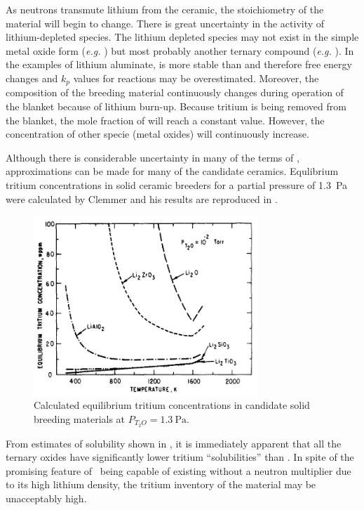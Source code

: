 \documentclass[11pt]{report} %
\newcommand{\lio}{\ce{Li2O}}
\begin{document}
As neutrons transmute lithium from the ceramic, the stoichiometry of the material will begin to change. There is great uncertainty in the activity of lithium-depleted species. The lithium depleted species may not exist in the simple metal oxide form (\textit{e.g.} ) but most probably another ternary compound (\textit{e.g.} ). In the examples of lithium aluminate,  is more stable than  and therefore free energy changes and $k_p$ values for reactions may be overestimated. Moreover, the composition of the breeding material continuously changes during operation of the blanket because of lithium burn-up. Because tritium is being removed from the blanket, the mole fraction of  will reach a constant value. However, the concentration of other specie (metal oxides) will continuously increase.

Although there is considerable uncertainty in many of the terms of , approximations can be made for many of the candidate ceramics. Equlibrium tritium concentrations in solid ceramic breeders for a  partial pressure of \SI{1.3}{\pascal} were calculated by Clemmer and his results are reproduced in .\cite{Clemmer1980}

\begin{figure}[ht]
	\centering
	\includegraphics[width=0.75\textwidth]{images/solubility} 
	\caption{Calculated equilibrium tritium concentrations in candidate solid breeding materials at $P_{T_2O} = \SI{1.3}{\pascal}$.}
	\label{fig:solubility}
\end{figure}

From estimates of solubility shown in , it is immediately apparent that all the ternary oxides have significantly lower tritium ``solubilities'' than \lio. In spite of the promising feature of \lio~being capable of existing without a neutron multiplier due to its high lithium density, the tritium inventory of the material may be unacceptably high.
\end{document}
